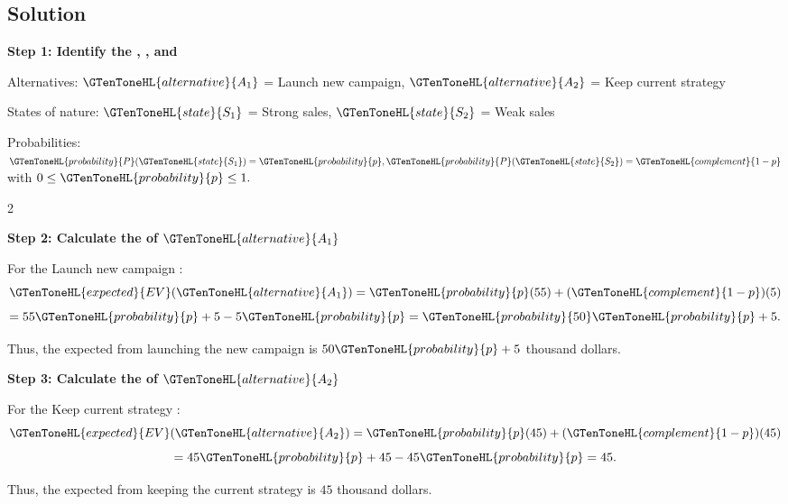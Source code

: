 	\vspace{-5mm}
	
	\subsection{Solution}
	
	\textbf{Step 1: Identify the ,   , and }
	
	Alternatives:
	$\GTenToneHL{alternative}{A_1}$ = Launch new campaign,
	$\GTenToneHL{alternative}{A_2}$ = Keep current strategy
	
	States of nature:
	$\GTenToneHL{state}{S_1}$ = Strong sales,
	$\GTenToneHL{state}{S_2}$ = Weak sales
	
	Probabilities:
	$
	\GTenToneHL{probability}{P}(\GTenToneHL{state}{S_1})=\GTenToneHL{probability}{p},
	\GTenToneHL{probability}{P}(\GTenToneHL{state}{S_2})=\GTenToneHL{complement}{1-p}
	$
	with
	$
	0\leq \GTenToneHL{probability}{p}\leq1.
	$
	
	\vspace{-3mm}
	
	\noindent
	\setlength{\columnseprule}{0.4pt}
	\begin{multicols}{2}
		\vspace{0pt}
		
		\textbf{Step 2: Calculate the   of $\GTenToneHL{alternative}{A_1}$}
		
		For the Launch new campaign :
		\[
		\GTenToneHL{expected}{EV}(\GTenToneHL{alternative}{A_1})
		=
		\GTenToneHL{probability}{p}(55)
		+
		(\GTenToneHL{complement}{1-p})(5)
		\]
		\[
		=
		55\GTenToneHL{probability}{p}+5-5\GTenToneHL{probability}{p}
		=
		\GTenToneHL{probability}{50}\GTenToneHL{probability}{p}+5.
		\]
		
		Thus, the expected  from launching the new campaign is
		$50\GTenToneHL{probability}{p}+5$ thousand dollars.
		
		\columnbreak
		
		\textbf{Step 3: Calculate the   of $\GTenToneHL{alternative}{A_2}$}
		
		For the Keep current strategy :
		\[
		\GTenToneHL{expected}{EV}(\GTenToneHL{alternative}{A_2})
		=
		\GTenToneHL{probability}{p}(45)
		+
		(\GTenToneHL{complement}{1-p})(45)
		\]
		\[
		=
		45\GTenToneHL{probability}{p}+45-45\GTenToneHL{probability}{p}
		=
		45.
		\]
		
		Thus, the expected  from keeping the current strategy is
		$45$ thousand dollars.
		
	\end{multicols}
	
